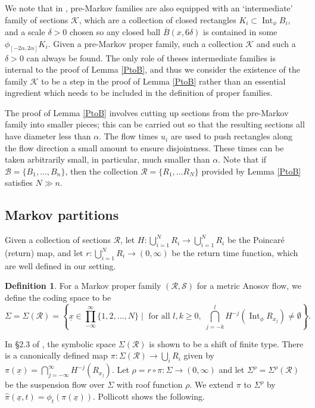 \documentclass[JEP,XML,SOM,Unicode,NoFloatCountersInSection]{cedram}
\let\mathcal\mathscr
\let\sep\mid
\theoremstyle{definition}
\newtheorem{defn}[thm]{Definition}
\numberwithin{equation}{section}
\DeclareMathOperator{\Int}{Int}
\newcommand\KKK{\mathcal K}
\newcommand\BBB{\mathcal B}
\newcommand\RRR{\mathcal R}
\newcommand\SSS{\mathcal S}
\begin{document}
We note that in \cite{bowen-symbolic, pollicott}, pre-Markov families are also equipped with an `intermediate' family of sections $\KKK$, which are a collection of closed rectangles $K_i \subset \Int_\phi B_i$, and a scale $\delta>0$ chosen so any closed ball $\overline B(x, 6\delta)$ is contained in some $\phi_{[-2 \alpha, 2 \alpha]}K_i$. Given a pre-Markov proper family, such a collection $\KKK$ and such a $\delta>0$ can always be found. The only role of theses intermediate families is internal to the proof of Lemma \ref{PtoB}, and thus we consider the existence of the family $\KKK$ to be a step in the proof of Lemma \ref{PtoB} rather than an essential ingredient which needs to be included in the definition of proper families.

The proof of Lemma \ref{PtoB} involves cutting up sections from the pre-Markov family into smaller pieces; this can be carried out so that the resulting sections all have diameter less than $\alpha$. The flow times $u_i$ are used to push rectangles along the flow direction a small amount to ensure disjointness. These times can be taken arbitrarily small, in particular, much smaller than $\alpha$. Note that if $\BBB = \{B_1, \ldots, B_n\}$, then the collection $\RRR= \{R_1, \ldots R_N\}$ provided by Lemma \ref{PtoB} satisfies $N \gg  n$.

\subsection{Markov partitions}

Given a collection of sections $\RRR$, let $H: \bigcup_{i=1}^N R_i \to \bigcup_{i=1}^N R_i$ be the Poincaré (return) map, and let $r: \bigcup_{i=1}^N R_i \to (0, \infty)$ be the return time function, which are well defined in our setting.

\begin{defn}
For a Markov proper family $(\RRR, \SSS)$ for a metric Anosov flow, we define the coding space to be
\[\textstyle \Sigma=\Sigma(\RRR)= \left \{ \underline x \in \prod_{-\infty}^{\infty}\{1, 2, \ldots, N\} \sep \text{ for all } l, k \geq 0,\; \bigcap_{j=-k}^l H^{-j}( \Int_\phi R_{x_j}) \neq \emptyset \right \}. \]
\end{defn}

In \S2.3 of \cite{pollicott}, the symbolic space $\Sigma(\RRR)$ is shown to be a shift of finite type. There is a canonically defined map $\pi: \Sigma(\RRR) \to \bigcup_i R_i$ given by $\pi(\underline x) = \bigcap_{j=-\infty}^\infty H^{-j}(R_{x_j})$. Let $\rho= r \circ \pi: \Sigma \to (0, \infty)$ and let $\Sigma^\rho=\Sigma^\rho(\RRR)$ be the suspension flow over $\Sigma$ with roof function $\rho$. We extend $\pi$ to $\Sigma^\rho$ by $\hat \pi(\underline x, t) = \phi_t(\pi(\underline x))$. Pollicott shows the following.
\end{document}
